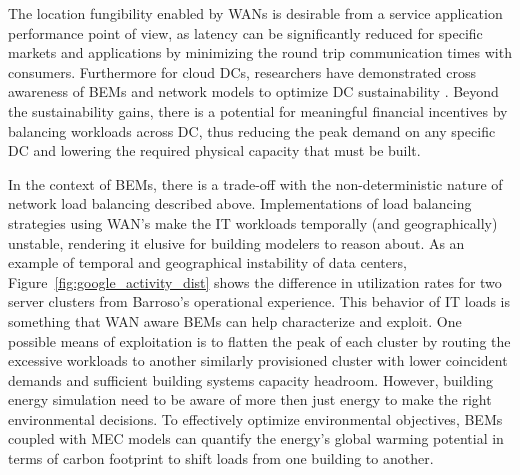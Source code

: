 The location fungibility enabled by WANs is desirable from a service application performance point of view, as latency can be significantly reduced for specific markets and applications by minimizing the round trip communication times with consumers. Furthermore for cloud DCs, researchers have demonstrated cross awareness of BEMs and network models to optimize DC sustainability \citep{tripathi17, kiani17}. Beyond the sustainability gains, there is a potential for meaningful financial incentives by balancing workloads across DC, thus reducing the peak demand on any specific DC and lowering the required physical capacity that must be built.

In the context of BEMs, there is a trade-off with the non-deterministic nature of network load balancing described above. Implementations of load balancing strategies using WAN's make the IT workloads temporally (and geographically) unstable, rendering it elusive for building modelers to reason about. As an example of temporal and geographical instability of data centers, Figure~\ref{fig:google_activity_dist} \citep{barroso18} shows the difference in utilization rates for two server clusters from Barroso's operational experience. This behavior of IT loads is something that WAN aware BEMs can help characterize and exploit. One possible means of exploitation is to flatten the peak of each cluster by routing the excessive workloads to another similarly provisioned cluster with lower coincident demands and sufficient building systems capacity headroom. However, building energy simulation need to be aware of more then just energy to make the right environmental decisions. To effectively optimize environmental objectives, BEMs coupled with MEC models can quantify the energy's global warming potential in terms of carbon footprint to shift loads from one building to another.

